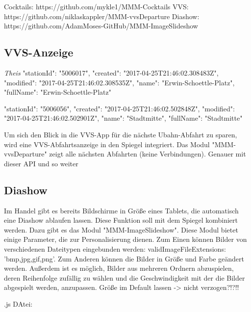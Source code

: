 \documentclass[12pt,a4paper]{report}
\begin{document}
Cocktails: https://github.com/mykle1/MMM-Cocktails
VVS: https://github.com/niklaskappler/MMM-vvsDeparture
Diashow: https://github.com/AdamMoses-GitHub/MMM-ImageSlideshow

\subsection{VVS-Anzeige}
\textit{Theis}
"stationId": "5006017",
"created": "2017-04-25T21:46:02.308483Z",
"modified": "2017-04-25T21:46:02.308535Z",
"name": "Erwin-Schoettle-Platz",
"fullName": "Erwin-Schoettle-Platz"

  "stationId": "5006056",
"created": "2017-04-25T21:46:02.502848Z",
"modified": "2017-04-25T21:46:02.502901Z",
"name": "Stadtmitte",
"fullName": "Stadtmitte"

Um sich den Blick in die VVS-App für die nächste Ubahn-Abfahrt zu sparen, wird eine VVS-Abfahrtsanzeige in den Spiegel integriert. Das Modul "MMM-vvsDeparture" zeigt alle nächsten Abfahrten (keine Verbindungen). 
Genauer mit dieser API und so weiter
\subsection{Diashow}
Im Handel gibt es bereits Bildschirme in Größe eines Tablets, die automatisch eine Diashow ablaufen lassen. Diese Funktion soll mit dem Spiegel kombiniert werden. Dazu gibt es das Modul "MMM-ImageSlideshow". 
Diese Modul bietet einige Parameter, die zur Personalisierung dienen. 
Zum Einen können Bilder von verschiedenen Dateitypen eingebunden werden: validImageFileExtensions: 'bmp,jpg,gif,png'. Zum Anderen können die Bilder in Größe und Farbe geändert werden. Außerdem ist es möglich, Bilder aus mehreren Ordnern abzuspielen, deren Reihenfolge zufällig zu wählen und die Geschwindigkeit mit der die Bilder abgespielt werden, anzupassen. 
Größe im Default lassen -> nicht verzogen?!?!!



.js DAtei:
\end{document}
